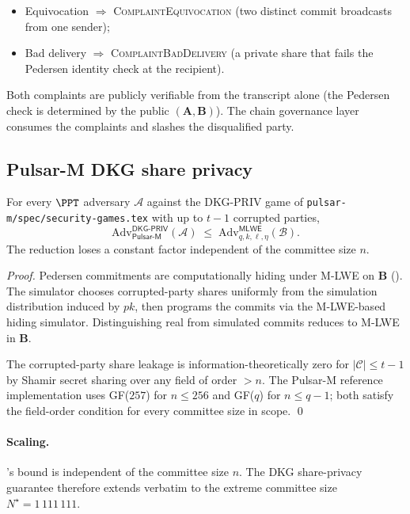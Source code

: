\begin{itemize}[leftmargin=*, itemsep=0pt]
\item Equivocation $\Rightarrow$ \textsc{ComplaintEquivocation} (two
distinct commit broadcasts from one sender);
\item Bad delivery $\Rightarrow$ \textsc{ComplaintBadDelivery} (a
private share that fails the Pedersen identity check at the
recipient).
\end{itemize}

Both complaints are publicly verifiable from the transcript alone
(the Pedersen check is determined by the public $(\mathbf{A},
\mathbf{B})$). The chain governance layer consumes the complaints
and slashes the disqualified party.

\subsection*{Pulsar-M DKG share privacy}

\begin{theorem}
\label{thm:pulsar-m-dkg-priv}
For every $\PPT$ adversary $\mathcal{A}$ against the DKG-PRIV game
of \texttt{pulsar-m/spec/security-games.tex} with up to $t-1$
corrupted parties,
\[
  \mathrm{Adv}^{\mathsf{DKG\text{-}PRIV}}_{\mathsf{Pulsar\text{-}M}}(\mathcal{A})
  \;\le\;
  \mathrm{Adv}^{\mathsf{MLWE}}_{q, k, \ell, \eta}(\mathcal{B}).
\]
The reduction loses a constant factor independent of the committee
size $n$.
\end{theorem}

\begin{proof}
Pedersen commitments are computationally hiding under M-LWE on
$\mathbf{B}$ (). The simulator chooses
corrupted-party shares uniformly from the simulation distribution
induced by $\mathit{pk}$, then programs the commits via the
M-LWE-based hiding simulator. Distinguishing real from simulated
commits reduces to M-LWE in $\mathbf{B}$.

The corrupted-party share leakage is information-theoretically zero
for $|\mathcal{C}| \le t - 1$ by Shamir secret sharing over any
field of order $> n$. The Pulsar-M reference implementation uses
GF($257$) for $n \le 256$ and GF($q$) for $n \le q - 1$; both
satisfy the field-order condition for every committee size in
scope. \qed
\end{proof}

\paragraph{Scaling.}
's bound is independent of the
committee size $n$. The DKG share-privacy guarantee therefore
extends verbatim to the extreme committee size $N^\star =
1\,111\,111$.
